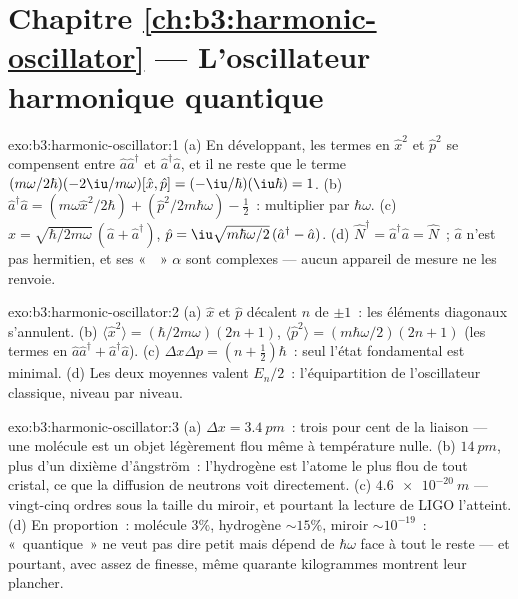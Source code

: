 \section*{Chapitre \ref{ch:b3:harmonic-oscillator} --- L'oscillateur harmonique quantique}

\begin{solution}{exo:b3:harmonic-oscillator:1}
(a) En développant, les termes en $\hat x^2$ et $\hat p^2$ se
compensent entre $\hat a\hat a^\dagger$ et $\hat a^\dagger\hat a$, et il
ne reste que le terme $(m\omega/2\hbar)(-2\iu/m\omega)[\hat x, \hat p] =
(-\iu/\hbar)(\iu\hbar) = 1$. (b) $\hat a^\dagger\hat a = (m\omega\hat x^2/2\hbar) +
(\hat p^2/2m\hbar\omega) - \tfrac12$~: multiplier par $\hbar\omega$. (c)
$\hat x = \sqrt{\hbar/2m\omega}\,(\hat a + \hat a^\dagger)$, $\hat p
= \iu\sqrt{m\hbar\omega/2}\,(\hat a^\dagger - \hat a)$. (d) $\hat
N^\dagger = \hat a^\dagger\hat a = \hat N$~; $\hat a$ n'est pas
hermitien, et ses «~~» $\alpha$ sont complexes --- aucun
appareil de mesure ne les renvoie.
\end{solution}

\begin{solution}{exo:b3:harmonic-oscillator:2}
(a) $\hat x$ et $\hat p$ décalent $n$ de $\pm1$~: les éléments
diagonaux s'annulent. (b) $\langle\hat x^2\rangle = (\hbar/2m\omega)(2n + 1)$,
$\langle\hat p^2\rangle = (m\hbar\omega/2)(2n + 1)$ (les termes en $\hat
a\hat a^\dagger + \hat a^\dagger\hat a$). (c) $\Delta x\Delta p
= (n + \tfrac12)\hbar$~: seul l'état fondamental est minimal. (d) Les
deux moyennes valent $E_n/2$~: l'équipartition de l'oscillateur
classique, niveau par niveau.
\end{solution}

\begin{solution}{exo:b3:harmonic-oscillator:3}
(a) $\Delta x = \qty{3.4}{pm}$~: trois pour cent de la liaison --- une
molécule est un objet légèrement flou même à température nulle. (b)
$\qty{14}{pm}$, plus d'un dixième d'ångström~: l'hydrogène est l'atome
le plus flou de tout cristal, ce que la diffusion de neutrons voit
directement. (c) $\qty{4.6e-20}{m}$ --- vingt-cinq ordres sous la
taille du miroir, et pourtant la lecture de LIGO l'atteint. (d) En
proportion~: molécule $3\%$, hydrogène $\sim15\%$, miroir
$\sim10^{-19}$~: «~quantique~» ne veut pas dire petit mais dépend de
$\hbar\omega$ face à tout le reste --- et pourtant, avec assez de
finesse, même quarante kilogrammes montrent leur plancher.
\end{solution}

